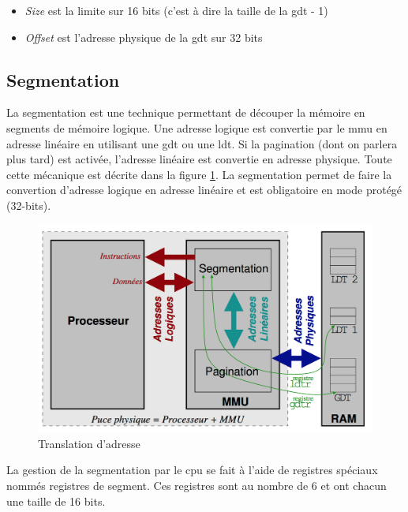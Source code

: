 \documentclass[a4paper, 12pt]{article}
\begin{document}
\begin{itemize}[label=\textbullet]
	\item \textit{Size} est la limite sur 16 bits (c'est à dire la taille de la
    \acrshort{gdt} - 1)
	\item \textit{Offset} est l'adresse physique de la \acrshort{gdt} sur 32 bits
\end{itemize}

\newpage


\subsection{Segmentation}
La segmentation est une technique permettant de découper la mémoire en segments
de mémoire logique. Une adresse logique est convertie par le \acrshort{mmu} en
adresse linéaire en utilisant une \acrshort{gdt} ou une \acrshort{ldt}.
Si la pagination (dont on parlera plus tard) est activée, l'adresse linéaire
est convertie en adresse physique. Toute cette mécanique est décrite dans la figure
\ref{addr_translation}. La segmentation permet de faire la convertion d'adresse
logique en adresse linéaire et est obligatoire en mode protégé (32-bits).\cite{ref17}

\begin{figure}[!h]
  \centering
  \includegraphics[scale=0.5]{images/addr_translation.png}
  \caption{Translation d'adresse}
  \label{addr_translation}
\end{figure}

La gestion de la segmentation par le \acrshort{cpu} se fait à l'aide de registres
spéciaux nommés registres de segment. Ces registres sont au nombre de 6 et ont
chacun une taille de 16 bits.\cite{ref42,ref18}
\end{document}
